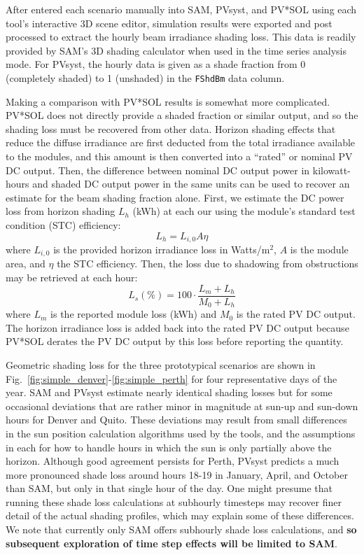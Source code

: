 \documentclass[twocolumn,10pt]{asme2ej}
\begin{document}
After entered each scenario manually into SAM, PVsyst, and PV*SOL using each tool's interactive 3D scene editor, simulation results were exported and post processed to extract the hourly beam irradiance shading loss.  This data is readily provided by SAM's 3D shading calculator when used in the time series analysis mode.  For PVsyst, the hourly data is given as a shade fraction from 0 (completely shaded) to 1 (unshaded) in the \texttt{FShdBm} data column. 

Making a comparison with PV*SOL results is somewhat more complicated.  PV*SOL does not directly provide a shaded fraction or similar output, and so the shading loss must be recovered from other data.  Horizon shading effects that reduce the diffuse irradiance are first deducted from the total irradiance available to the modules, and this amount is then converted into a ``rated'' or nominal PV DC output.  Then, the difference between nominal DC output power in kilowatt-hours and shaded DC output power in the same units can be used to recover an estimate for the beam shading fraction alone.  First, we estimate the DC power loss from horizon shading $L_h$ (kWh) at each our using the module's standard test condition (STC) efficiency:
\begin{equation}\label{eqn:pvsol_lh}
L_h = L_{i,0} A \eta
\end{equation}
where $L_{i,0}$ is the provided horizon irradiance loss in Watts/m$^2$, $A$ is the module area, and $\eta$ the STC efficiency.  Then, the loss due to shadowing from obstructions may be retrieved at each hour:
\begin{equation}\label{eqn:pvsol_ls}
L_s (\%) = 100 \cdot \frac{ L_m + L_h }{ M_{0} + L_h }
\end{equation}
where $L_{m}$ is the reported module loss (kWh) and $M_0$ is the rated PV DC output. The horizon irradiance loss is added back into the rated PV DC output because PV*SOL derates the PV DC output by this loss before reporting the quantity.  

Geometric shading loss for the three prototypical scenarios are shown in Fig.~\ref{fig:simple_denver}-\ref{fig:simple_perth} for four representative days of the year.  SAM and PVsyst estimate nearly identical shading losses but for some occasional deviations that are rather minor in magnitude at sun-up and sun-down hours for Denver and Quito.  These deviations may result from small differences in the sun position calculation algorithms used by the tools, and the assumptions in each for how to handle hours in which the sun is only partially above the horizon.  Although good agreement persists for Perth, PVsyst predicts a much more pronounced shade loss around hours 18-19 in January, April, and October than SAM, but only in that single hour of the day.  One might presume that running these shade loss calculations at subhourly timesteps may recover finer detail of the actual shading profiles, which may explain some of these differences.  We note that currently only SAM offers subhourly shade loss calculations, and \textbf{so subsequent exploration of time step effects will be limited to SAM}.
\end{document}
